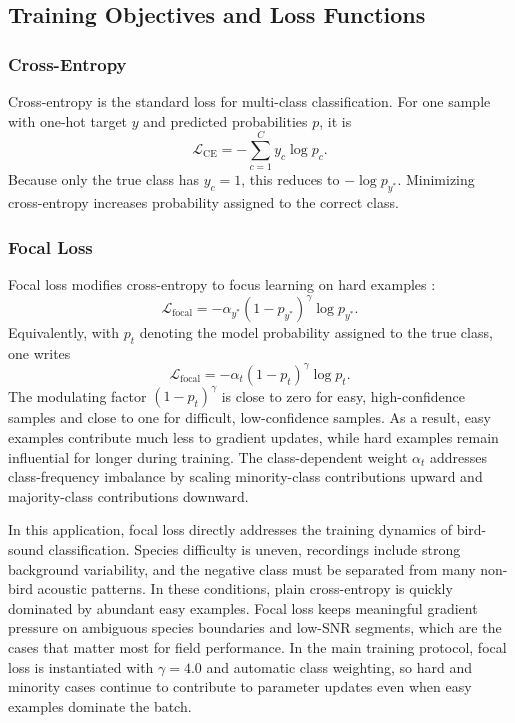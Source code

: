 \documentclass[a4paper,singleside,12pt]{report} %
\begin{document}
	\subsection{Training Objectives and Loss Functions}
	\label{sec:training_objectives_losses}
	\subsubsection{Cross-Entropy}
	Cross-entropy is the standard loss for multi-class classification. For one sample with one-hot target \(y\) and predicted probabilities \(p\), it is
	\begin{equation}
		\mathcal{L}_{\mathrm{CE}} = -\sum_{c=1}^{C} y_c \log p_c.
	\end{equation}
	Because only the true class has \(y_c=1\), this reduces to \(-\log p_{y^\ast}\). Minimizing cross-entropy increases probability assigned to the correct class.

	\subsubsection{Focal Loss}
	Focal loss modifies cross-entropy to focus learning on hard examples \cite{lin2017focal}:
	\begin{equation}
		\mathcal{L}_{\mathrm{focal}} = -\alpha_{y^\ast}(1-p_{y^\ast})^\gamma \log p_{y^\ast}.
	\end{equation}
	Equivalently, with \(p_t\) denoting the model probability assigned to the true class, one writes
	\begin{equation}
		\mathcal{L}_{\mathrm{focal}} = -\alpha_t(1-p_t)^\gamma \log p_t.
	\end{equation}
	The modulating factor \((1-p_t)^\gamma\) is close to zero for easy, high-confidence samples and close to one for difficult, low-confidence samples. As a result, easy examples contribute much less to gradient updates, while hard examples remain influential for longer during training. The class-dependent weight \(\alpha_t\) addresses class-frequency imbalance by scaling minority-class contributions upward and majority-class contributions downward.

	In this application, focal loss directly addresses the training dynamics of bird-sound classification. Species difficulty is uneven, recordings include strong background variability, and the negative class must be separated from many non-bird acoustic patterns. In these conditions, plain cross-entropy is quickly dominated by abundant easy examples. Focal loss keeps meaningful gradient pressure on ambiguous species boundaries and low-SNR segments, which are the cases that matter most for field performance.
	In the main training protocol, focal loss is instantiated with \(\gamma=4.0\) and automatic class weighting, so hard and minority cases continue to contribute to parameter updates even when easy examples dominate the batch.
\end{document}
